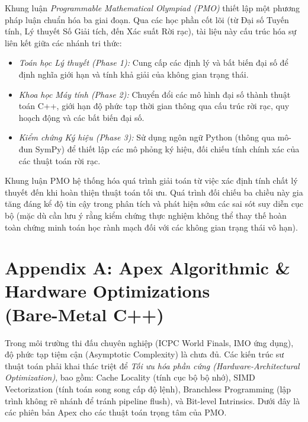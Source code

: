 \documentclass{article}
\begin{document}
Khung luận \textit{Programmable Mathematical Olympiad (PMO)} thiết lập một phương pháp luận chuẩn hóa ba giai đoạn. Qua các học phần cốt lõi (từ Đại số Tuyến tính, Lý thuyết Số Giải tích, đến Xác suất Rời rạc), tài liệu này cấu trúc hóa sự liên kết giữa các nhánh tri thức:
\begin{itemize}
 \item \textit{Toán học Lý thuyết (Phase 1):} Cung cấp các định lý và bất biến đại số để định nghĩa giới hạn và tính khả giải của không gian trạng thái.
 \item \textit{Khoa học Máy tính (Phase 2):} Chuyển đổi các mô hình đại số thành thuật toán C++, giới hạn độ phức tạp thời gian thông qua cấu trúc rời rạc, quy hoạch động và các bất biến đại số.
 \item \textit{Kiểm chứng Ký hiệu (Phase 3):} Sử dụng ngôn ngữ Python (thông qua mô-đun SymPy) để thiết lập các mô phỏng ký hiệu, đối chiếu tính chính xác của các thuật toán rời rạc.
\end{itemize}

Khung luận PMO hệ thống hóa quá trình giải toán từ việc xác định tính chất lý thuyết đến khi hoàn thiện thuật toán tối ưu. Quá trình đối chiếu ba chiều này gia tăng đáng kể độ tin cậy trong phân tích và phát hiện sớm các sai sót suy diễn cục bộ (mặc dù cần lưu ý rằng kiểm chứng thực nghiệm không thể thay thế hoàn toàn chứng minh toán học rành mạch đối với các không gian trạng thái vô hạn).


\newpage


\section*{Appendix A: Apex Algorithmic \& Hardware Optimizations\texorpdfstring{\\(Bare-Metal C++)}{ (Bare-Metal C++)}}

Trong môi trường thi đấu chuyên nghiệp (ICPC World Finals, IMO ứng dụng), độ phức tạp tiệm cận (Asymptotic Complexity) là chưa đủ. Các kiến trúc sư thuật toán phải khai thác triệt để \emph{Tối ưu hóa phần cứng (Hardware-Architectural Optimization)}, bao gồm: Cache Locality (tính cục bộ bộ nhớ), SIMD Vectorization (tính toán song song cấp độ lệnh), Branchless Programming (lập trình không rẽ nhánh để tránh pipeline flush), và Bit-level Intrinsics. Dưới đây là các phiên bản Apex cho các thuật toán trọng tâm của PMO.
\end{document}
